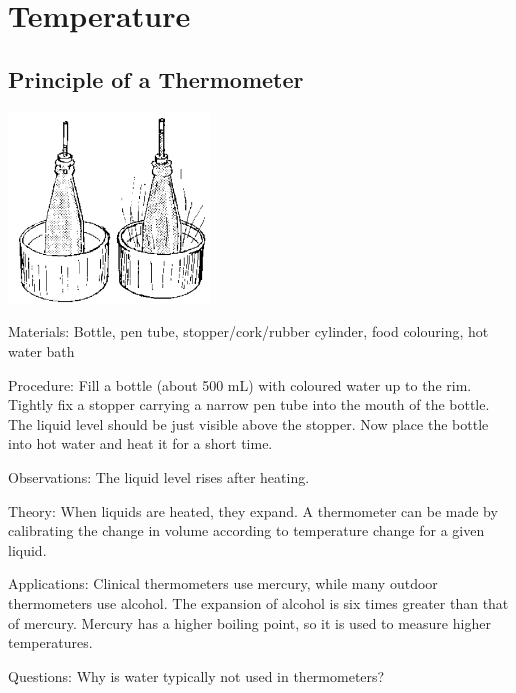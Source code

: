 \section{Temperature} 

\begin{multicols}{2}


\subsection{Principle of a Thermometer}

\begin{center}
\includegraphics[width=0.4\textwidth]{./img/source/thermometer.png}
\end{center}

\begin{description*}
\item[Materials:]{Bottle, pen tube, stopper/cork/rubber cylinder, food colouring, hot water bath}
\item[Procedure:]{Fill a bottle (about 500 mL) with coloured water up to the rim. Tightly fix a stopper carrying a narrow pen tube into the mouth of the bottle. The liquid level should be just visible above the stopper. Now place the bottle into hot water and heat it for a short time.}
\item[Observations:]{The liquid level rises after heating.}
\item[Theory:]{When liquids are heated, they expand. A thermometer can be made by calibrating the change in volume according to temperature change for a given liquid.}
\item[Applications:]{Clinical thermometers use mercury, while many outdoor thermometers use alcohol. The expansion of alcohol is six times greater than that of mercury. Mercury has a higher boiling point, so it is used to measure higher temperatures.}
\item[Questions:]{Why is water typically not used in thermometers?}
\end{description*}


\end{multicols}

